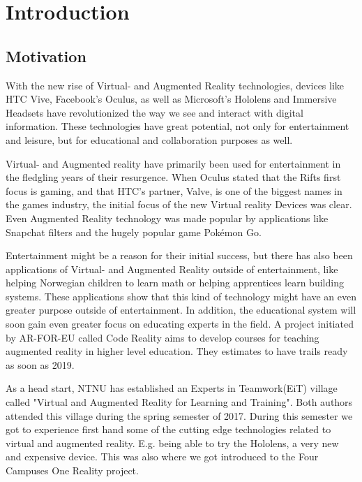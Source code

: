 \chapter{Introduction}
    \label{chapter:introduction}
    \section{Motivation}
        With the new rise of Virtual- and Augmented Reality technologies, devices like HTC Vive\cite{vive}, Facebook's Oculus\cite{oculus}, as well as Microsoft's Hololens\cite{hololens} and Immersive Headsets\cite{immersiveheadsets} have revolutionized the way we see and interact with digital information. These technologies have great potential, not only for entertainment and leisure, but for educational and collaboration purposes as well.
    
        Virtual- and Augmented reality have primarily been used for entertainment in the fledgling years of their resurgence. When Oculus stated that the Rifts first focus is gaming\cite{OculusMarkZuckerberg}, and that HTC's partner, Valve, is one of the biggest names in the games industry\cite{ValveBigName}, the initial focus of the new Virtual reality Devices was clear. Even Augmented Reality technology was made popular by applications like Snapchat\cite{Snapchat} filters and the hugely popular game Pokémon Go\cite{PokemonGo}.
        
        Entertainment might be a reason for their initial success, but there has also been applications of Virtual- and Augmented Reality outside of entertainment, like helping Norwegian children to learn math\cite{innomag2017} or helping apprentices learn building systems\cite{Nordbohus2017}. These applications show that this kind of technology might have an even greater purpose outside of entertainment. In addition, the educational system will soon gain even greater focus on educating experts in the field. A project initiated by AR-FOR-EU called Code Reality aims to develop courses for teaching augmented reality in higher level education. \cite{codereality} They estimates to have trails ready as soon as 2019.
        
        As a head start, NTNU has established an Experts in Teamwork(EiT) village called "Virtual and Augmented Reality for Learning and Training". Both authors attended this village during the spring semester of 2017. During this semester we got to experience first hand some of the cutting edge technologies related to virtual and augmented reality. E.g. being able to try the Hololens, a very new and expensive device. This was also where we got introduced to the Four Campuses One Reality project.
        
